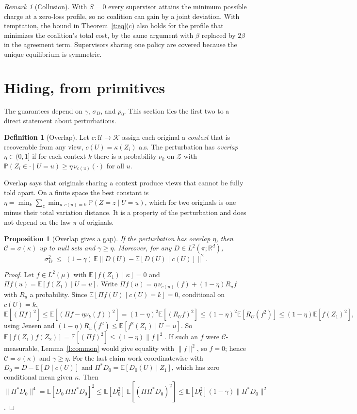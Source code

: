 \documentclass[11pt]{article}
\newtheorem{proposition}{Proposition}
\theoremstyle{definition}
\newtheorem{definition}{Definition}
\theoremstyle{remark}
\newtheorem{remark}{Remark}
\newcommand{\E}{\mathbb{E}}
\renewcommand{\P}{\mathbb{P}}
\newcommand{\R}{\mathbb{R}}
\newcommand{\cC}{\mathcal{C}}
\newcommand{\cZ}{\mathcal{Z}}
\newcommand{\cU}{\mathcal{U}}
\newcommand{\norm}[1]{\lVert #1\rVert}
\begin{document}
\begin{remark}[Collusion]
With $S=0$ every supervisor attains the minimum possible charge at a zero-loss profile, so no coalition can gain by a joint deviation. With temptation, the bound in Theorem~\ref{t:eq}(c) also holds for the profile that minimizes the coalition's total cost, by the same argument with $\beta$ replaced by $2\beta$ in the agreement term. Supervisors sharing one policy are covered because the unique equilibrium is symmetric.
\end{remark}

\section{Hiding, from primitives}\label{sec:hiding}

The guarantees depend on $\gamma$, $\sigma_D$, and $p_0$. This section ties the first two to a direct statement about perturbations.

\begin{definition}[Overlap]\label{d:overlap}
Let $c:\cU\to\mathcal K$ assign each original a \emph{context} that is recoverable from any view, $c(U)=\kappa(Z_i)$ a.s. The perturbation has \emph{overlap} $\eta\in(0,1]$ if for each context $k$ there is a probability $\nu_k$ on $\cZ$ with
$\P(Z_i\in\cdot\mid U=u)\ge\eta\,\nu_{c(u)}(\cdot)$ for all $u$.
\end{definition}

Overlap says that originals sharing a context produce views that cannot be fully told apart. On a finite space the best constant is $\eta=\min_k\sum_z\min_{u:c(u)=k}\P(Z=z\mid U=u)$, which for two originals is one minus their total variation distance. It is a property of the perturbation and does not depend on the law $\pi$ of originals.

\begin{proposition}[Overlap gives a gap]\label{p:overlap}
If the perturbation has overlap $\eta$, then $\cC=\sigma(\kappa)$ up to null sets and $\gamma\ge\eta$. Moreover, for any $D\in L^2(\pi;\R^d)$,
\[
\sigma_D^2\;\le\;(1-\gamma)\,\E\norm{D(U)-\E[D(U)\mid c(U)]}^2 .
\]
\end{proposition}
\begin{proof}
Let $f\in L^2(\mu)$ with $\E[f(Z_1)\mid\kappa]=0$ and $\Pi f(u)=\E[f(Z_1)\mid U=u]$. Write $\Pi f(u)=\eta\,\nu_{c(u)}(f)+(1-\eta)R_uf$ with $R_u$ a probability. Since $\E[\Pi f(U)\mid c(U)=k]=0$, conditional on $c(U)=k$,
\[
\E[(\Pi f)^2]\le\E[(\Pi f-\eta\nu_k(f))^2]=(1-\eta)^2\E[(R_Uf)^2]\le(1-\eta)^2\E[R_U(f^2)]\le(1-\eta)\E[f(Z_1)^2],
\]
using Jensen and $(1-\eta)R_u(f^2)\le\E[f^2(Z_1)\mid U=u]$. So $\E[f(Z_1)f(Z_2)]=\E[(\Pi f)^2]\le(1-\eta)\norm f^2$. If such an $f$ were $\cC$-measurable, Lemma~\ref{l:common} would give equality with $\norm f^2$, so $f=0$; hence $\cC=\sigma(\kappa)$ and $\gamma\ge\eta$. For the last claim work coordinatewise with $D_0=D-\E[D\mid c(U)]$ and $\Pi^*D_0=\E[D_0(U)\mid Z_1]$, which has zero conditional mean given $\kappa$. Then
$\norm{\Pi^*D_0}^4=\E[D_0\,\Pi\Pi^*D_0]^2\le\E[D_0^2]\,\E[(\Pi\Pi^*D_0)^2]\le\E[D_0^2](1-\gamma)\norm{\Pi^*D_0}^2$.
\end{proof}
\end{document}
